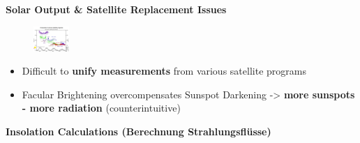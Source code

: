 \documentclass[fontsize=8pt, a4paper, landscape, fleqn]{scrartcl}
\renewcommand{\subsection}[1]{%
    \noindent\colorbox{subsectioncolor}{%
        \parbox{\dimexpr\columnwidth-2\fboxsep}{\color{white}\textbf{#1}}}%
    \vspace{0.5mm}%
}
\begin{document}
\begin{multicols*}{3}[\raggedcolumns]
\subsection{Solar Output \& Satellite Replacement Issues}
\begin{figure}
    \centering
    \includegraphics[width=0.12\textwidth]{Secondary/img/Pasted image 20250407180714.png}
\end{figure}
\begin{itemize}
    \item Difficult to \textbf{unify measurements} from various satellite programs
    \item Facular Brightening overcompensates Sunspot Darkening -> \textbf{more sunspots - more radiation} (counterintuitive)
\end{itemize}

\subsection{Insolation Calculations (Berechnung Strahlungsflüsse)}

\end{multicols*}
\end{document}
